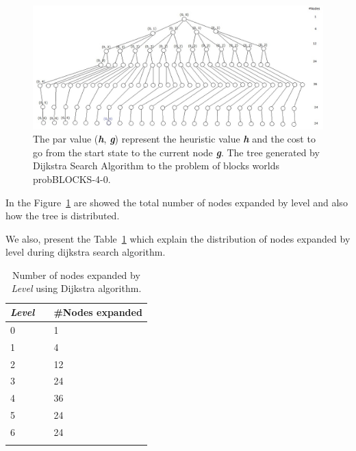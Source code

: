\documentclass[11pt,a4paper,oneside]{report}
\begin{document}
\begin{figure}[htb]
\begin{center}
\includegraphics[width=12cm]{./image/dijkstra}
\caption{The par value (\textbf{\textit{h}}, \textbf{\textit{g}}) represent the heuristic value \textbf{\textit{h}} and the cost to go from the start state to the current node \textbf{\textit{g}}. The tree generated by Dijkstra Search Algorithm to the problem of blocks worlds probBLOCKS-4-0.}
\label{fig:dijkstraTreeInconsistent}
\end{center}
\end{figure}

In the Figure~\ref{fig:dijkstraTreeInconsistent} are showed the total number of nodes expanded by level and also how the tree is distributed.\newline

We also, present the Table~\ref{table:tabledijstraExpandedByLevel} which explain the distribution of nodes expanded by level during dijkstra search algorithm.\newline

\footnotesize  %
\setlength\LTleft{100pt}            %
\setlength\LTright{200pt}           %
\begin{longtable}{@{\extracolsep{\fill}} lll @{}} %
\hline
\textit{Level} && \#Nodes expanded \\ \hline
0       && 1                \\ \hline
1       && 4                \\ \hline
2       && 12               \\ \hline
3       && 24               \\ \hline
4       && 36               \\ \hline
5       && 24               \\ \hline
6       && 24               \\ \hline
\caption{Number of nodes expanded by \textit{Level} using Dijkstra algorithm.}
\label{table:tabledijstraExpandedByLevel}
\end{longtable}
\end{document}
